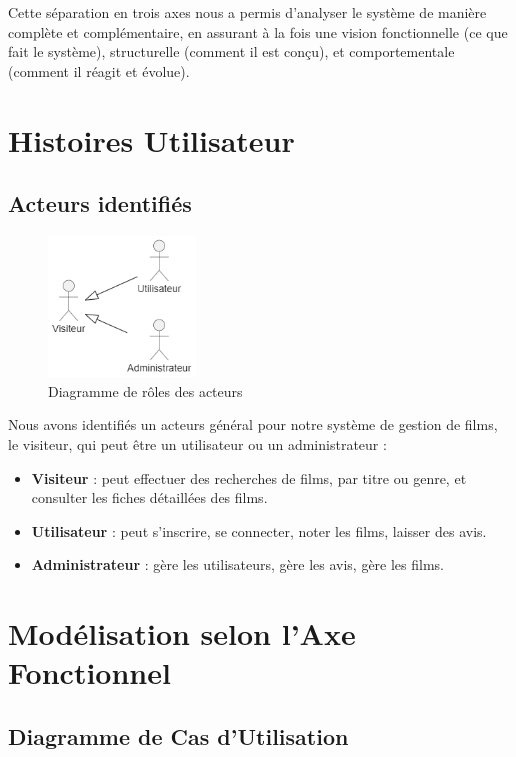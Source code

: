 \documentclass{article}
\begin{document}
Cette séparation en trois axes nous a permis d'analyser le système de manière complète et complémentaire, en assurant à la fois une vision fonctionnelle (ce que fait le système), structurelle (comment il est conçu), et comportementale (comment il réagit et évolue).



\section{Histoires Utilisateur}
\subsection{Acteurs identifiés}
\begin{figure}[H]
    \centering
    \includegraphics[width=0.35\textwidth]{images/role.png}
    \caption{Diagramme de rôles des acteurs}
\end{figure}
Nous avons identifiés un acteurs général pour notre système de gestion de films, le visiteur, qui peut être un utilisateur ou un administrateur :
\begin{itemize}
    \item \textbf{Visiteur} : peut effectuer des recherches de films, par titre ou genre, et consulter les fiches détaillées des films.
    \item \textbf{Utilisateur} : peut s’inscrire, se connecter, noter les films, laisser des avis.
    \item \textbf{Administrateur} : gère les utilisateurs, gère les avis, gère les films.
\end{itemize}

\section{Modélisation selon l'Axe Fonctionnel}
\subsection{Diagramme de Cas d’Utilisation}
\end{document}
